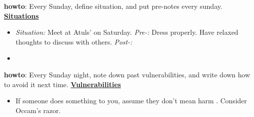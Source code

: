 \documentclass[serif, mathserif, final]{beamer}
\newcommand{\comments}[1]{}
\begin{document}
{            %
            \textbf{howto}: Every Sunday, define situation, and put pre-notes every sunday. \\
            \textbf{\small \underline{Situations}} \\ 
            \begin{itemize}
            \item \tiny \textit{Situation:} Meet at Atuls' on
              Saturday. \textit{Pre-:}  Dress properly. Have relaxed
              thoughts to discuss with others. \textit{Post-:} 
           \item \tiny 
            \end{itemize}
            \textbf{howto}: Every Sunday night, note down  past vulnerabilities, and write down how to avoid it next time.
            \textbf{\small \underline{Vulnerabilities}}\\
            \begin{itemize}
              \tiny \item \tiny If someone does something to you, assume they don't mean harm  . Consider Occam's razor. 
            \end{itemize}    
            \newpage              
            \comments{
              \noindent\begin{minipage}{\textwidth}
              \begin{minipage}[c][6cm][c]{\dimexpr0.5\textwidth-0.5\Colsep\relax}
                \lipsum[4]
              \end{minipage}\hfill
              \begin{minipage}[c][6cm][c]{\dimexpr0.5\textwidth-0.5\Colsep\relax}
                \lipsum[4]
              \end{minipage}%
              \end{minipage}
              \lipsum[4]
            }
            
}
\end{document}
